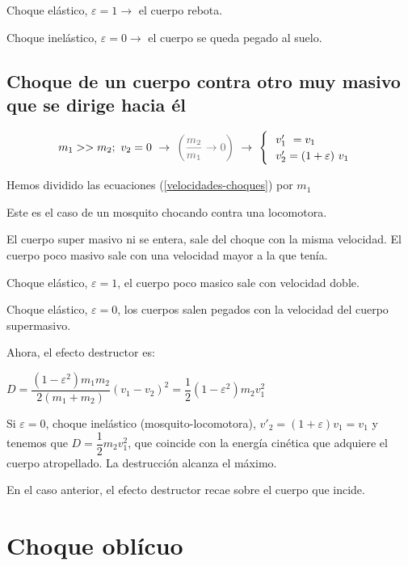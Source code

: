 Choque elástico, $\varepsilon=1 \to $ el cuerpo rebota.

Choque inelástico, $\varepsilon=0 \to $ el cuerpo se queda pegado al suelo.

\subsection{Choque de un cuerpo contra otro muy masivo que se dirige hacia él}


$$m_1>>m_2;\ v_2=0\ \to \ \textcolor{gris}{\left( \dfrac{m_2}{m_1}\to 0 \right)} \ \to \ \begin{cases}
 \ \ v'_1\ = v_1 \\ \ \  v'_2=(1+\varepsilon)\ v_1	
\end{cases}$$

\textcolor{gris}{ Hemos dividido las ecuaciones (\ref{velocidades-choques}) por $m_1$}

Este es el caso de un mosquito chocando contra una locomotora.

El cuerpo super masivo ni se entera, sale del choque con la misma velocidad. El cuerpo poco masivo sale con una velocidad mayor a la que tenía.

Choque elástico, $\varepsilon=1$, el cuerpo poco masico sale con velocidad doble.

Choque elástico, $\varepsilon=0$, los cuerpos salen pegados con la velocidad del cuerpo supermasivo.

Ahora, el efecto destructor es:

$D=\dfrac{(1-\varepsilon^2)m_1m_2}{2(m_1+m_2)} (v_1-v_2)^2=\dfrac 1 2 (1-\varepsilon^2)m_2v_1^2$ 

Si $\varepsilon=0$, choque inelástico (mosquito-locomotora), $v'_2=(1+\varepsilon)v_1=v_1$ y tenemos que $D=\dfrac 1 2 m_2 v_1^2$,  que coincide con la energía cinética que adquiere el cuerpo atropellado. La destrucción alcanza el máximo.

En el caso anterior, el efecto destructor recae sobre el cuerpo que incide.

\section{Choque oblícuo}

